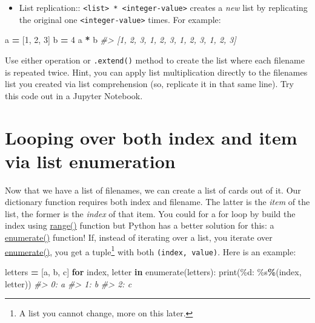 \documentclass[
]{book}
\newenvironment{Shaded}{\begin{snugshade}}{\end{snugshade}}
\newcommand{\BuiltInTok}[1]{#1}
\newcommand{\CommentTok}[1]{\textcolor[rgb]{0.56,0.35,0.01}{\textit{#1}}}
\newcommand{\ControlFlowTok}[1]{\textcolor[rgb]{0.13,0.29,0.53}{\textbf{#1}}}
\newcommand{\DecValTok}[1]{\textcolor[rgb]{0.00,0.00,0.81}{#1}}
\newcommand{\KeywordTok}[1]{\textcolor[rgb]{0.13,0.29,0.53}{\textbf{#1}}}
\newcommand{\NormalTok}[1]{#1}
\newcommand{\OperatorTok}[1]{\textcolor[rgb]{0.81,0.36,0.00}{\textbf{#1}}}
\newcommand{\SpecialCharTok}[1]{\textcolor[rgb]{0.00,0.00,0.00}{#1}}
\newcommand{\StringTok}[1]{\textcolor[rgb]{0.31,0.60,0.02}{#1}}
\providecommand{\tightlist}{%
  \setlength{\itemsep}{0pt}\setlength{\parskip}{0pt}}
\begin{document}
\begin{itemize}
\tightlist
\item
  List replication:: \texttt{\textless{}list\textgreater{}\ *\ \textless{}integer-value\textgreater{}} creates a \emph{new} list by replicating the original one \texttt{\textless{}integer-value\textgreater{}} times. For example:
\end{itemize}

\begin{Shaded}
\begin{Highlighting}[]
\NormalTok{a }\OperatorTok{=}\NormalTok{ [}\DecValTok{1}\NormalTok{, }\DecValTok{2}\NormalTok{, }\DecValTok{3}\NormalTok{]}
\NormalTok{b }\OperatorTok{=} \DecValTok{4}
\NormalTok{a }\OperatorTok{*}\NormalTok{ b}
\CommentTok{\#\textgreater{} [1, 2, 3, 1, 2, 3, 1, 2, 3, 1, 2, 3]}
\end{Highlighting}
\end{Shaded}

Use either operation or \texttt{.extend()} method to create the list where each filename is repeated twice. Hint, you can apply list multiplication directly to the filenames list you created via list comprehension (so, replicate it in that same line). Try this code out in a Jupyter Notebook.

\hypertarget{enumerate}{%
\section{Looping over both index and item via list enumeration}\label{enumerate}}

Now that we have a list of filenames, we can create a list of cards out of it. Our dictionary function requires both index and filename. The latter is the \emph{item} of the list, the former is the \emph{index} of that item. You could for a for loop by build the index using \protect\hyperlink{range}{range()} function but Python has a better solution for this: a \href{https://docs.python.org/3/library/functions.html\#enumerate}{enumerate()} function! If, instead of iterating over a list, you iterate over \href{https://docs.python.org/3/library/functions.html\#enumerate}{enumerate()}, you get a tuple\footnote{A list you cannot change, more on this later.} with both \texttt{(index,\ value)}. Here is an example:

\begin{Shaded}
\begin{Highlighting}[]
\NormalTok{letters }\OperatorTok{=}\NormalTok{ [}\StringTok{\textquotesingle{}a\textquotesingle{}}\NormalTok{, }\StringTok{\textquotesingle{}b\textquotesingle{}}\NormalTok{, }\StringTok{\textquotesingle{}c\textquotesingle{}}\NormalTok{]}
\ControlFlowTok{for}\NormalTok{ index, letter }\KeywordTok{in} \BuiltInTok{enumerate}\NormalTok{(letters):}
    \BuiltInTok{print}\NormalTok{(}\StringTok{\textquotesingle{}}\SpecialCharTok{\%d}\StringTok{: }\SpecialCharTok{\%s}\StringTok{\textquotesingle{}}\OperatorTok{\%}\NormalTok{(index, letter))}
\CommentTok{\#\textgreater{} 0: a}
\CommentTok{\#\textgreater{} 1: b}
\CommentTok{\#\textgreater{} 2: c}
\end{Highlighting}
\end{Shaded}
\end{document}
